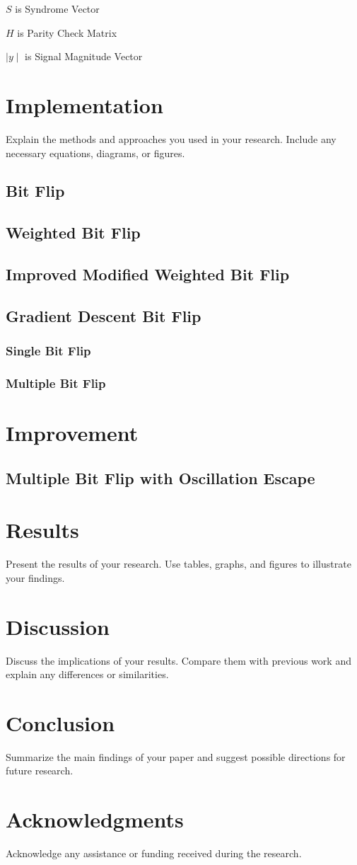 \documentclass[a4paper,conference]{IEEEtran}
\begin{document}
\( S \) is Syndrome Vector

\( H \) is Parity Check Matrix

\( \mid y\mid  \) is Signal Magnitude Vector
\section{Implementation}
Explain the methods and approaches you used in your research. Include any necessary equations, diagrams, or figures.
\subsection{Bit Flip}
\subsection{Weighted Bit Flip}
\subsection{Improved Modified Weighted Bit Flip}
\subsection{Gradient Descent Bit Flip}
\subsubsection{Single Bit Flip}
\subsubsection{Multiple Bit Flip}


\section{Improvement}

\subsection{Multiple Bit Flip with Oscillation Escape}


\section{Results}
Present the results of your research. Use tables, graphs, and figures to illustrate your findings.

\section{Discussion}
Discuss the implications of your results. Compare them with previous work and explain any differences or similarities.

\section{Conclusion}
Summarize the main findings of your paper and suggest possible directions for future research.

\section*{Acknowledgments}
Acknowledge any assistance or funding received during the research.



\end{document}
